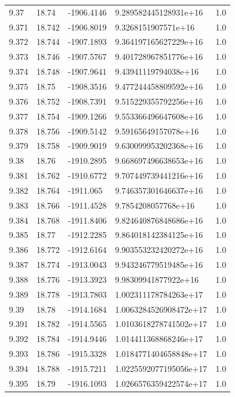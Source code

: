 \begin{tabular}{lllll}
9.37 & 18.74 & -1906.4146 & 9.289582445128931e+16 & 1.0 \\
9.371 & 18.742 & -1906.8019 & 9.3268151907571e+16 & 1.0 \\
9.372 & 18.744 & -1907.1893 & 9.364197165627229e+16 & 1.0 \\
9.373 & 18.746 & -1907.5767 & 9.401728967851776e+16 & 1.0 \\
9.374 & 18.748 & -1907.9641 & 9.43941119794038e+16 & 1.0 \\
9.375 & 18.75 & -1908.3516 & 9.477244458809592e+16 & 1.0 \\
9.376 & 18.752 & -1908.7391 & 9.515229355792256e+16 & 1.0 \\
9.377 & 18.754 & -1909.1266 & 9.553366496647608e+16 & 1.0 \\
9.378 & 18.756 & -1909.5142 & 9.59165649157078e+16 & 1.0 \\
9.379 & 18.758 & -1909.9019 & 9.630099953202368e+16 & 1.0 \\
9.38 & 18.76 & -1910.2895 & 9.668697496638653e+16 & 1.0 \\
9.381 & 18.762 & -1910.6772 & 9.707449739441216e+16 & 1.0 \\
9.382 & 18.764 & -1911.065 & 9.746357301646637e+16 & 1.0 \\
9.383 & 18.766 & -1911.4528 & 9.7854208057768e+16 & 1.0 \\
9.384 & 18.768 & -1911.8406 & 9.824640876848686e+16 & 1.0 \\
9.385 & 18.77 & -1912.2285 & 9.864018142384125e+16 & 1.0 \\
9.386 & 18.772 & -1912.6164 & 9.903553232420272e+16 & 1.0 \\
9.387 & 18.774 & -1913.0043 & 9.943246779519485e+16 & 1.0 \\
9.388 & 18.776 & -1913.3923 & 9.98309941877922e+16 & 1.0 \\
9.389 & 18.778 & -1913.7803 & 1.002311178784263e+17 & 1.0 \\
9.39 & 18.78 & -1914.1684 & 1.0063284526908472e+17 & 1.0 \\
9.391 & 18.782 & -1914.5565 & 1.0103618278741502e+17 & 1.0 \\
9.392 & 18.784 & -1914.9446 & 1.014411368868246e+17 & 1.0 \\
9.393 & 18.786 & -1915.3328 & 1.0184771404658848e+17 & 1.0 \\
9.394 & 18.788 & -1915.7211 & 1.0225592077195056e+17 & 1.0 \\
9.395 & 18.79 & -1916.1093 & 1.0266576359422574e+17 & 1.0 \\

\end{tabular}
